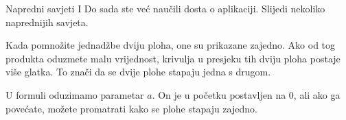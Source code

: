 \begin{surferPage}{Napredni savjeti I}
Do sada ste ve\' c nau\v cili dosta o aplikaciji. Slijedi nekoliko naprednijih savjeta.

\vspace{0.3cm}
Kada pomno\v zite jednad\v zbe dviju ploha, one su prikazane zajedno. Ako od tog produkta oduzmete malu vrijednost, krivulja u presjeku tih dviju ploha postaje vi\v se glatka. To zna\v ci da se dvije plohe stapaju jedna s drugom.

\vspace{0.3cm}
U formuli oduzimamo parametar $a$. On je u po\v cetku postavljen na $0$, ali ako ga pove\' cate, mo\v zete promatrati kako se plohe stapaju zajedno.
\end{surferPage}
